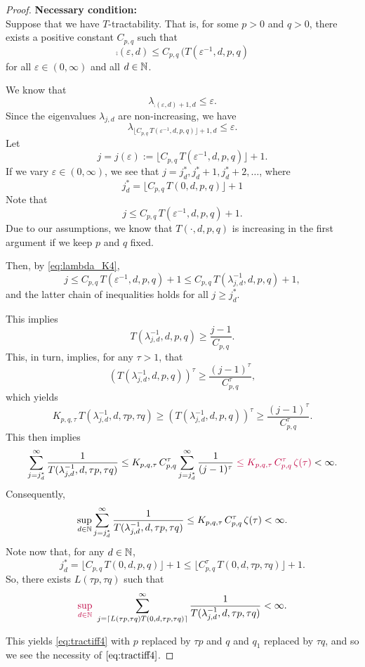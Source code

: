 \documentclass[11pt,a4paper]{article}
\newcommand{\peter}[1]{\begingroup\color{purple}#1\endgroup}
\begin{document}
{\begin{proof}
\textbf{Necessary condition:}\\
Suppose that we have 
$T$-tractability. That is, for some $p>0$ and $q>0$, there exists a positive constant $C_{p,q}$ such that 
\[
\comp(\varepsilon,d)\le C_{p,q}\, (T(\varepsilon^{-1},d,p,q)
\]
for all $\varepsilon\in (0,\infty)$ and all $d\in\mathbb{N}$.


We know that
\[
\lambda_{\comp(\varepsilon,d)+1,d}\le \varepsilon.
\]
Since the eigenvalues $\lambda_{j,d}$ are non-increasing, we have
\begin{equation}\label{eq:lambda_K4}
\lambda_{\lfloor C_{p,q}\, T(\varepsilon^{-1},d,p,q)\rfloor +1,d}\le \varepsilon.
\end{equation}
Let
\[
j=j (\varepsilon):= \lfloor C_{p,q}\, T(\varepsilon^{-1},d,p,q)\rfloor +1.
\]
If we vary $\varepsilon\in (0,\infty)$, we see that $j=j_d^*, j_d^*+1, j_d^*+2,\ldots$, where 
\[
  j_d^*=\lfloor C_{p,q}\, T(0,d,p,q)\rfloor +1
\]
Note that
\[
j\le C_{p,q}\, T(\varepsilon^{-1},d,p,q) +1.
\]
Due to our assumptions, we know that 
$T(\cdot,d,p,q)$ is increasing in the first argument if 
we keep $p$ and $q$ fixed.  

Then, by \eqref{eq:lambda_K4},
\[
j \le C_{p,q}\, T(\varepsilon^{-1},d,p,q) +1 \le C_{p,q}\, T(\lambda_{j,d}^{-1},d,p,q) +1,
\]
and the latter chain of inequalities holds for all $j\ge j_d^*$.

This implies
\[ 
T(\lambda_{j,d}^{-1},d, p,q) \ge \frac{j-1}{C_{p,q}}.
\]
This, in turn, implies, for any $\tau>1$, that 
\[ 
 (T(\lambda_{j,d}^{-1},d,p,q))^\tau \ge \frac{(j-1)^\tau}{C_{p,q}^\tau},
\]
which yields
\[ 
 K_{p,q,\tau}\, T (\lambda_{j,d}^{-1},d,\tau p,\tau q) \ge (T(\lambda_{j,d}^{-1},d, p,q))^\tau 
 \ge \frac{(j-1)^\tau}{C_{p,q}^\tau}.
\]
This then implies
\[
\sum_{j=j_d^*}^\infty \frac{1}{T(\lambda_{j,d}^{-1},d, \tau p,\tau q)} 
\le K_{p,q,\tau}\, C_{p,q}^\tau \sum_{j=j_d^*}^\infty \frac{1}{(j-1)^\tau}
\peter{\le K_{p,q,\tau}\, C_{p,q}^\tau \, \zeta(\tau)}
<\infty.
\]
\peter{
Consequently,
\[
\sup_{d\in\mathbb{N}} \sum_{j=j_d^*}^\infty \frac{1}{T(\lambda_{j,d}^{-1},d, \tau p,\tau q)} \le K_{p,q,\tau}\, C_{p,q}^\tau \, \zeta(\tau) < \infty.
\]
}
Note now that, \peter{for any $d\in\mathbb{N}$,}
\[
 j_d^* = \lfloor C_{p,q}\, T(0,d,p,q)\rfloor +1 \le \lfloor C_{p,q}^\tau\, T(0,d,\tau p,\tau q)\rfloor +1.
\]
So, there exists $L(\tau p,\tau q)$ such that 
\[
\peter{\sup_{d\in\naturals}}\,\, \sum_{j=\lceil L(\tau p,\tau q) T(0,d,\tau p,\tau q)\rceil}^\infty \frac{1}{T(\lambda_{j,d}^{-1},d, \tau p,\tau q)}<\infty.
\]


This yields \eqref{eq:tractiff4} with $p$ replaced by $\tau p$ and $q$ and $q_1$ replaced by $\tau q$, and so we see the necessity of $\eqref{eq:tractiff4}$. 


\end{proof}}
\end{document}
